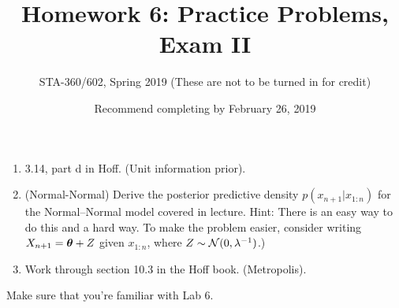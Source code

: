 \documentclass{article}
\begin{document}
\title{Homework 6: Practice Problems, Exam II}
\author{STA-360/602, Spring 2019 (These are not to be turned in for credit)}
\date{Recommend completing by February 26, 2019}
\maketitle


\begin{enumerate}
\item 3.14, part d in Hoff. (Unit information prior). 
\item (Normal-Normal)  Derive the posterior predictive density $p(x_{n +1}|x_{1:n})$ for the Normal--Normal model covered in lecture. Hint: There is an easy way to do this and a hard way. To make the problem easier, consider writing $X_{n+1} = {\bm\theta} + Z$ given $x_{1:n}$, where $Z\sim\mathcal{N}(0,\lambda^{-1})$.)
\item Work through section 10.3 in the Hoff book. (Metropolis). 
\end{enumerate}

Make sure that you're familiar with Lab 6. 
\end{document}
